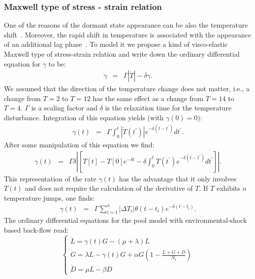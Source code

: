 \documentclass[10pt,A4paper]{article}
\begin{document}
\subsubsection{Maxwell type of stress - strain relation}
One of the reasons of the dormant state appearance can be also the temperature shift~\cite{oliver_viable_1995}.
Moreover, the rapid shift in temperature is associated with the appearance of an additional lag phase~\cite{zwietering_modeling_1994}.
To model it we propose a kind of visco-elastic Maxwell type of stress-strain relation and write down the ordinary differential equation for $\gamma$ to be:
\begin{eqnarray}
    \dot{\gamma} &=& \Gamma \left |\dot{T}\right |-\delta \gamma.
\end{eqnarray}
We assumed that the direction of the temperature change does not matter, i.e., a change from $T=2$ to $T=12$ has the same effect as a change from $T=14$ to $T=4$. 
$\Gamma$ is a scaling factor and $\delta$ is the relaxation time for the temperature disturbance. 
Integration of this equation yields (with $\gamma(0)=0$):
\begin{eqnarray}
    \gamma(t) &=& \Gamma \int_0^t \left |\dot{T}(t^{\prime})\right |e^{-\delta (t-t^{\prime})}dt^{\prime}.
\end{eqnarray}
After some manipulation of this equation we find:
\begin{eqnarray}
    \gamma(t) &=& \Gamma\delta\left |\left[T[t]-T[0]e^{-\delta t}-\delta \int_0^t T(t^{\prime})e^{-\delta (t-t^{\prime})}dt^{\prime}\right]\right |.
\end{eqnarray}
This representation of the rate $\gamma(t)$ has the advantage that it only involves $T(t)$ and does not require the calculation of the derivative of $T$. 
If $T$ exhibits $n$ temperature jumps, one finds:
\begin{eqnarray}
    \gamma(t) &=& \Gamma\sum_{i=1}^n \left |\Delta T_i \right |\theta(t-t_i)e^{-\delta(t-t_i)}.
    \label{eq:gamma_tempshift}
\end{eqnarray}
%
The ordinary differential equations for the pool model with environmental-shock based back-flow read:
\begin{equation}
    \begin{cases}
    \dot{L} =\gamma(t) G - (\mu + \lambda) L\\
    \dot{G} = \lambda L -\gamma(t) G + \alpha G\left(1-\frac{L+G+D}{N_t}\right)\\
    \dot{D} = \mu  L - \beta D
    \label{eq:ODE_tempshift}
    \end{cases}
\end{equation}
\end{document}
